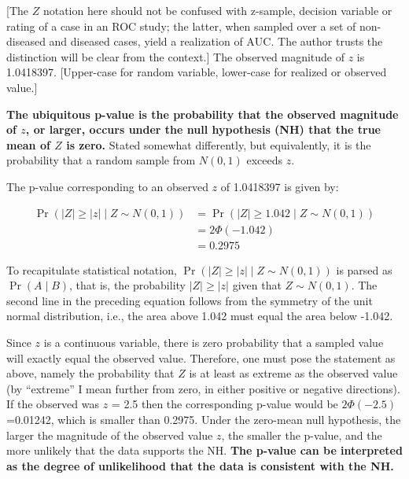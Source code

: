 \documentclass[
]{book}
\begin{document}
{[}The \(Z\) notation here should not be confused with z-sample, decision variable or rating of a case in an ROC study; the latter, when sampled over a set of non-diseased and diseased cases, yield a realization of \(\text{AUC}\). The author trusts the distinction will be clear from the context.{]} The observed magnitude of \(z\) is 1.0418397. {[}Upper-case for random variable, lower-case for realized or observed value.{]}

\textbf{The ubiquitous p-value is the probability that the observed magnitude of \(z\), or larger, occurs under the null hypothesis (NH) that the true mean of \(Z\) is zero.} Stated somewhat differently, but equivalently, it is the probability that a random sample from \(N(0,1)\) exceeds \(z\).

The p-value corresponding to an observed \(z\) of 1.0418397 is given by:

\begin{align*} 
\Pr\left ( \lvert Z \rvert \geq \lvert z \rvert \mid Z\sim N\left ( 0,1 \right )\right )&=\Pr\left ( \lvert Z \rvert \geq 1.042 \mid Z\sim N\left ( 0,1 \right )\right )\\
&= 2\Phi\left ( -1.042 \right )\\
&= 0.2975
\end{align*}

To recapitulate statistical notation, \(\Pr\left ( \lvert Z \rvert \geq \lvert z \rvert \mid Z\sim N\left ( 0,1 \right )\right )\) is parsed as \(\Pr\left ( A\mid B \right )\), that is, the probability \(\lvert Z \rvert \geq \lvert z \rvert\) given that \(Z\sim N\left ( 0,1 \right )\). The second line in the preceding equation follows from the symmetry of the unit normal distribution, i.e., the area above 1.042 must equal the area below -1.042.

Since \(z\) is a continuous variable, there is zero probability that a sampled value will exactly equal the observed value. Therefore, one must pose the statement as above, namely the probability that \(Z\) is at least as extreme as the observed value (by ``extreme'' I mean further from zero, in either positive or negative directions). If the observed was \(z\) = 2.5 then the corresponding p-value would be \(2\Phi(-2.5)\)=0.01242, which is smaller than 0.2975. Under the zero-mean null hypothesis, the larger the magnitude of the observed value \(z\), the smaller the p-value, and the more unlikely that the data supports the NH. \textbf{The p-value can be interpreted as the degree of unlikelihood that the data is consistent with the NH.}
\end{document}

